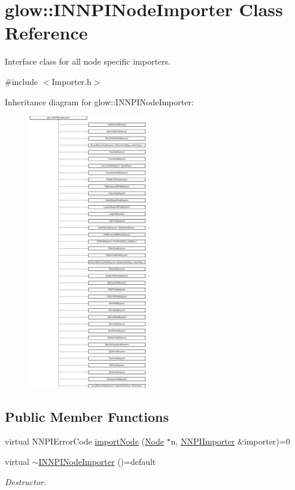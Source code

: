 \hypertarget{classglow_1_1_i_n_n_p_i_node_importer}{}\section{glow\+:\+:I\+N\+N\+P\+I\+Node\+Importer Class Reference}
\label{classglow_1_1_i_n_n_p_i_node_importer}


Interface class for all node specific importers.  




{\ttfamily \#include $<$Importer.\+h$>$}

Inheritance diagram for glow\+:\+:I\+N\+N\+P\+I\+Node\+Importer\+:\begin{figure}[H]
\begin{center}
\leavevmode
\includegraphics[height=12.000000cm]{classglow_1_1_i_n_n_p_i_node_importer}
\end{center}
\end{figure}
\subsection*{Public Member Functions}
\begin{DoxyCompactItemize}
\item 
virtual N\+N\+P\+I\+Error\+Code \hyperlink{classglow_1_1_i_n_n_p_i_node_importer_aa861e10cb0c17a92abb94bf613b57807}{import\+Node} (\hyperlink{classglow_1_1_node}{Node} $\ast$n, \hyperlink{classglow_1_1_n_n_p_i_importer}{N\+N\+P\+I\+Importer} \&importer)=0
\item 
\mbox{\label{classglow_1_1_i_n_n_p_i_node_importer_a2b520031fad04d4d7ee284ef2c7958ae}} 
virtual \hyperlink{classglow_1_1_i_n_n_p_i_node_importer_a2b520031fad04d4d7ee284ef2c7958ae}{$\sim$\+I\+N\+N\+P\+I\+Node\+Importer} ()=default
\begin{DoxyCompactList}\small\item\em Destructor. \end{DoxyCompactList}\end{DoxyCompactItemize}


